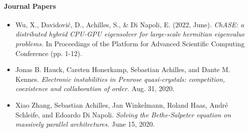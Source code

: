 \paragraph{Journal Papers}

\begin{itemize}
  \item [] Wu, X., Davidović, D., Achilles, S., \& Di Napoli, E. (2022, June). \emph{ChASE: a distributed hybrid CPU-GPU eigensolver for large-scale hermitian eigenvalue problems.} In Proceedings of the Platform for Advanced Scientific Computing Conference (pp. 1-12).
  \item [] Jonas B. Hauck, Carsten Honerkamp, Sebastian Achilles, and Dante M. Kennes. \emph{Electronic
instabilities in Penrose quasi-crystals: competition, coexistence and collaboration of order.} Aug. 31, 2020.
  \item[] Xiao Zhang, Sebastian Achilles, Jan Winkelmann, Roland Haas, André Schleife, and Edoardo Di
Napoli. \emph{Solving the Bethe-Salpeter equation on massively parallel architectures.} June 15, 2020.
\end{itemize}


\newpage
